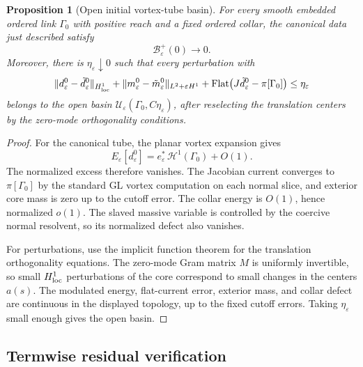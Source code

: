 \documentclass[11pt]{article}
\newtheorem{proposition}[theorem]{Proposition}
\theoremstyle{definition}
\newcommand{\eps}{\varepsilon}
\newcommand{\estar}{e_\varepsilon^\ast}
\newcommand{\Basin}{\mathcal B}
\newcommand{\Hh}{\mathcal H}
\begin{document}
\begin{proposition}[Open initial vortex-tube basin]
\label{prop:open-initial-basin}
For every smooth embedded ordered link \(\Gamma_0\) with positive reach and a
fixed ordered collar, the canonical data just described satisfy
\[
        \Basin_\eps^+(0)\to0 .
\]
Moreover, there is \(\eta_\eps\downarrow0\) such that every perturbation with
\[
        \|d_\eps^0-\tilde d_\eps^0\|_{H^1_{\rm loc}}
        +
        \|m_\eps^0-\tilde m_\eps^0\|_{L^2+\eps H^1}
        +
        {\rm Flat}\bigl(J\tilde d_\eps^0-\pi[\Gamma_0]\bigr)
        \le
        \eta_\eps
\]
belongs to the open basin \(\mathcal U_\eps(\Gamma_0,C\eta_\eps)\), after
reselecting the translation centers by the zero-mode orthogonality conditions.
\end{proposition}

\begin{proof}
For the canonical tube, the planar vortex expansion gives
\[
        E_\eps[d_\eps^0]
        =
        \estar\,\Hh^1(\Gamma_0)+O(1).
\]
The normalized excess therefore vanishes.  The Jacobian current converges to
\(\pi[\Gamma_0]\) by the standard GL vortex computation on each normal slice,
and exterior core mass is zero up to the cutoff error.  The collar energy is
\(O(1)\), hence normalized \(o(1)\).  The slaved massive variable is controlled
by the coercive normal resolvent, so its normalized defect also vanishes.

For perturbations, use the implicit function theorem for the translation
orthogonality equations.  The zero-mode Gram matrix \(M\) is uniformly
invertible, so small \(H^1_{\rm loc}\) perturbations of the core correspond to
small changes in the centers \(a(s)\).  The modulated energy, flat-current
error, exterior mass, and collar defect are continuous in the displayed
topology, up to the fixed cutoff errors.  Taking \(\eta_\eps\) small enough
gives the open basin.
\end{proof}

\subsection{Termwise residual verification}
\end{document}
